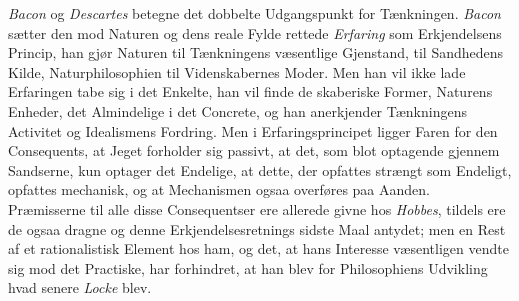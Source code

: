 \documentclass[12pt,a4paper]{book}
\newcommand{\opage}[1]{\marginnote{\footnotesize\textit{[#1]}}}
\begin{document}
\emph{Bacon} og \emph{Descartes} betegne det dobbelte Udgangspunkt for
Tænkningen. \emph{Bacon} sætter den mod Naturen og dens reale Fylde
rettede \emph{Erfaring} som Erkjendelsens Princip, han gjør Naturen
til Tænkningens væsentlige Gjenstand, til Sandhedens Kilde,
Naturphilosophien til Videnskabernes Moder. Men han vil ikke lade
Erfaringen tabe sig i det Enkelte, han vil finde de skaberiske Former,
Naturens Enheder, det Almindelige i det Concrete, og han anerkjender
Tænkningens Activitet og Idealismens Fordring. Men i
Erfaringsprincipet ligger Faren for den Consequents, at Jeget
forholder sig passivt, at det, som blot optagende gjennem Sandserne,
kun optager det Endelige, at dette, der opfattes strængt som Endeligt,
opfattes mechanisk, og at Mechanismen ogsaa overføres paa Aanden.
Præmisserne til alle disse Consequentser ere allerede givne hos
\emph{Hobbes}, tildels ere de ogsaa dragne og denne
Erkjendelsesretnings
\opage{8} sidste Maal antydet; men en Rest af et rationalistisk Element hos ham,
og det, at hans Interesse væsentligen vendte sig mod det Practiske,
har forhindret, at han blev for Philosophiens Udvikling hvad senere
\emph{Locke} blev.
\end{document}
